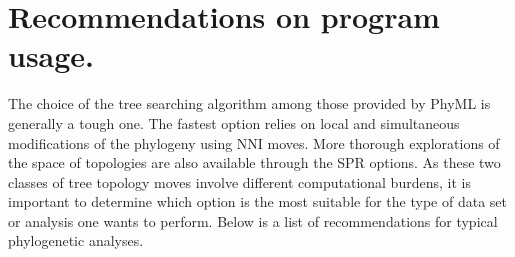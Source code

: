 \documentclass[a4paper,12pt]{article}
\begin{document}
\section{Recommendations on program usage.}

The choice of the  tree searching algorithm among those provided by PhyML  is generally a tough one.
The  fastest option  relies  on local  and simultaneous  modifications  of the  phylogeny using  NNI
moves. More  thorough explorations of  the space  of topologies are  also available through  the SPR
options.  As these  two classes of tree topology moves involve  different computational burdens, it
is important to determine which option is the most suitable for the type of data set or analysis one
wants to perform. Below is a list of recommendations for typical phylogenetic analyses.
\end{document}
